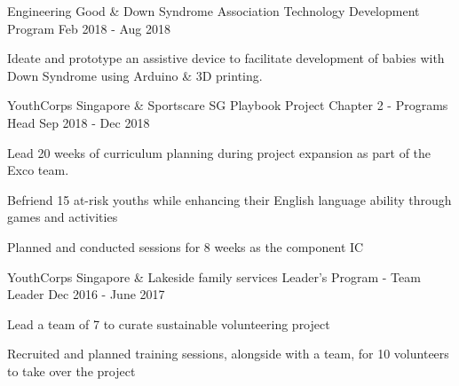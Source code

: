 
\begin{cventries}
  \cventry
    {Engineering Good \& Down Syndrome Association} %
    {Technology Development Program} %
    {} %
    {Feb 2018 - Aug 2018} %
    {
      \begin{cvitems} %
      	\item {Ideate and prototype an assistive device to facilitate development of babies with Down Syndrome using Arduino \& 3D printing.}
      \end{cvitems}
    }
    
\vspace{0.8mm}
    \cventry
    {YouthCorps Singapore \& Sportscare SG } %
    {Playbook Project Chapter 2 - Programs Head } %
    {} %
    {Sep 2018 - Dec 2018} %
    {
      \begin{cvitems} %
        \item {Lead 20 weeks of curriculum planning during project expansion as part of the Exco team.}
        \item {Befriend 15 at-risk youths while enhancing their English language ability through games and activities}
        \item {Planned and conducted sessions for 8 weeks as the component IC }
      \end{cvitems}
    }

\vspace{0.8mm}
  \cventry
    {YouthCorps Singapore \& Lakeside family services} %
    {Leader’s Program - Team Leader} %
    {} %
    {Dec 2016 - June 2017} %
    {
      \begin{cvitems} %
        \item {Lead a team of 7 to curate sustainable volunteering project}
        \item {Recruited and planned training sessions, alongside with a team, for 10 volunteers to take over the project}
      \end{cvitems}
    }
    
\end{cventries}